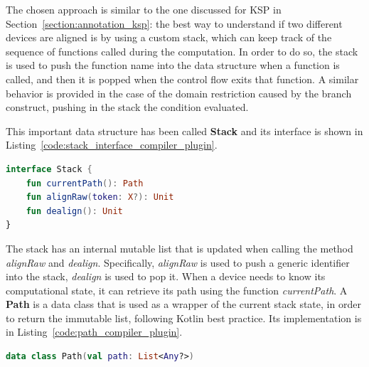 The chosen approach is similar to the one discussed for KSP in Section~\ref{section:annotation_ksp}: the best way to understand if two different devices are aligned is by using a custom stack, which can keep track of the sequence of functions called during the computation. In order to do so, the stack is used to push the function name into the data structure when a function is called, and then it is popped when the control flow exits that function. A similar behavior is provided in the case of the domain restriction caused by the branch construct, pushing in the stack the condition evaluated.

This important data structure has been called \textbf{Stack} and its interface is shown in Listing~\ref{code:stack_interface_compiler_plugin}.
\begin{lstlisting}[caption={Stack interface for Kotlin compiler plugin solution}, captionpos=b, language=Kotlin, label={code:stack_interface_compiler_plugin}]
interface Stack {
    fun currentPath(): Path
    fun alignRaw(token: X?): Unit
    fun dealign(): Unit
}
\end{lstlisting}
The stack has an internal mutable list that is updated when calling the method \textit{alignRaw} and \textit{dealign}. Specifically, \textit{alignRaw} is used to push a generic identifier into the stack, \textit{dealign} is used to pop it.\newline
When a device needs to know its computational state, it can retrieve its path using the function \textit{currentPath}. A \textbf{Path} is a data class that is used as a wrapper of the current stack state, in order to return the immutable list, following Kotlin best practice. Its implementation is in Listing~\ref{code:path_compiler_plugin}.
\begin{lstlisting}[caption={Path dataclass for Kotlin compiler plugin solution}, captionpos=b, language=Kotlin, label={code:path_compiler_plugin}]
data class Path(val path: List<Any?>)
\end{lstlisting}

